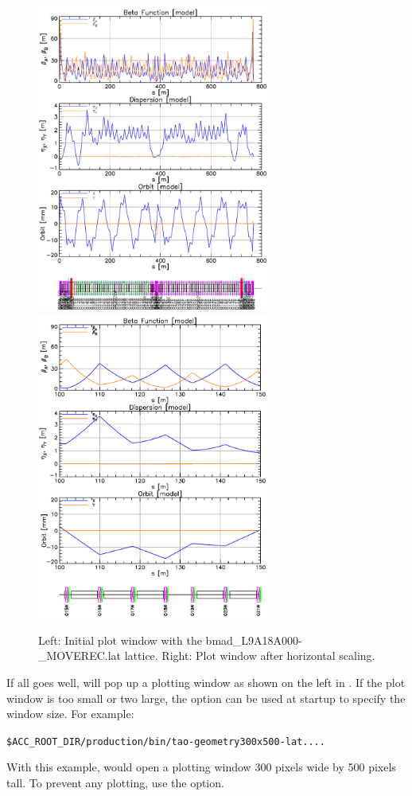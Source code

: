 \documentclass{hitec}
\begin{document}
\begin{figure}[t]
\begin{centering}
\includegraphics[width=3in]{tao-start.pdf}
\hfill
\includegraphics[width=3in]{tao-x-scale.pdf}
\caption{Left: Initial \tao plot window with the bmad_L9A18A000-_MOVEREC.lat lattice.
Right: Plot window after horizontal scaling.}
\label{f:tao-start}
\end{centering}
\end{figure}

If all goes well, \tao will pop up a plotting window as shown on the left in
. If the plot window is too small or two large, the  option
can be used at startup to specify the window size. For example:
\begin{alltt}
  \$ACC_ROOT_DIR/production/bin/tao -geometry 300x500 -lat ....
\end{alltt}
With this example, \tao would open a plotting window 300 pixels wide by 500 pixels tall.
To prevent any plotting, use the  option.
\end{document}
